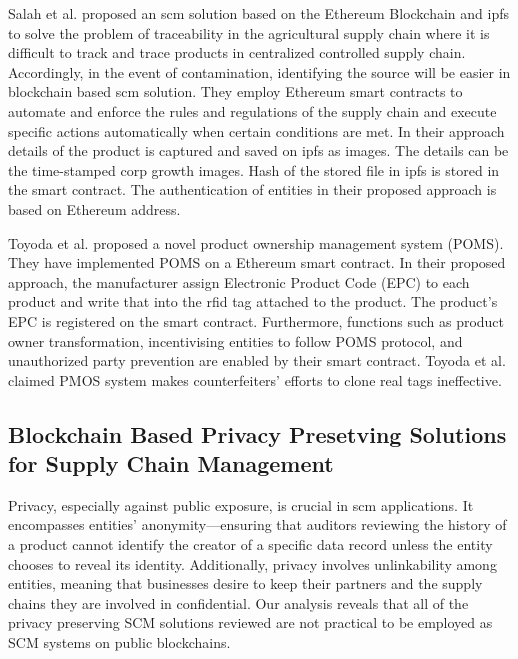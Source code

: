 Salah et al. \cite{Salah2019} proposed an \gls{scm} solution based on the Ethereum Blockchain and \gls{ipfs} to solve the problem of traceability in the agricultural supply chain where it is difficult to track and trace products in centralized controlled supply chain. Accordingly, in the event of contamination, identifying the source will be easier in blockchain based \gls{scm} solution. They employ Ethereum smart contracts to automate and enforce the rules and regulations of the supply chain and execute specific actions automatically when certain conditions are met. In their approach details of the product is captured and saved on \gls{ipfs} as images. The details can be the time-stamped corp growth images. Hash of the stored file in \gls{ipfs} is stored in the smart contract. The authentication of entities in their proposed approach is based on Ethereum address.

Toyoda et al. \cite{Toyoda2017} proposed a novel product ownership management system (POMS). They have implemented POMS on a Ethereum smart contract. In their proposed approach, the manufacturer assign Electronic Product Code (EPC) to each product and write that into the \gls{rfid} tag attached to the product. The product's EPC is registered on the smart contract. Furthermore, functions such as product owner transformation, incentivising entities to follow POMS protocol, and unauthorized party prevention are enabled by their smart contract. Toyoda et al. claimed PMOS system makes counterfeiters' efforts to clone real tags ineffective. 


\subsection{Blockchain Based Privacy Presetving Solutions for Supply Chain Management}\label{sec:lit_pp_bc_scm}

Privacy, especially against public exposure, is crucial in \gls{scm} applications. It encompasses entities' anonymity—ensuring that auditors reviewing the history of a product cannot identify the creator of a specific data record unless the entity chooses to reveal its identity. Additionally, privacy involves unlinkability among entities, meaning that businesses desire to keep their partners and the supply chains they are involved in confidential. Our analysis reveals that all of the privacy preserving SCM solutions reviewed are not practical to be employed as SCM systems on public blockchains. 

